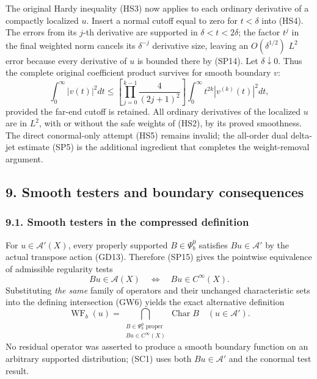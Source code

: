 \documentclass[
  11pt,
]{article}
\makeatletter
\let\ReaderOriginalAnchorStart\hyper@anchorstart
\let\ReaderOriginalAnchorEnd\hyper@anchorend
\let\ReaderPendingAliases\@empty
\def\ReaderArmAliases#1{\gdef\ReaderPendingAliases{#1}}
\def\hyper@anchorstart#1{\ReaderIfNativeAnchorTF{#1}{\ReaderPendingAliases\global\let\ReaderPendingAliases\@empty}{}\ReaderOriginalAnchorStart{#1}}
\makeatother
\begin{document}
The original Hardy inequality (HS3) now applies to each ordinary
derivative of a compactly localized \(u\). Insert a normal cutoff equal
to zero for \(t<\delta\) into (HS4). The errors from its \(j\)-th
derivative are supported in \(\delta<t<2\delta\); the factor \(t^j\) in
the final weighted norm cancels its \(\delta^{-j}\) derivative size,
leaving an \(O(\delta^{1/2})\) \(L^2\) error because every derivative of
\(u\) is bounded there by (SP14). Let \(\delta\downarrow0\). Thus the
complete original coefficient product survives for smooth boundary
\(v\): \[
 \int_0^\infty|v(t)|^2dt
 \le\left[\prod_{j=0}^{k-1}
         \frac4{(2j+1)^2}\right]
       \int_0^\infty t^{2k}|v^{(k)}(t)|^2dt,
 \tag{SP16}
\] provided the far-end cutoff is retained. All ordinary derivatives of
the localized \(u\) are in \(L^2\), with or without the safe weights of
(HS2), by its proved smoothness. The direct conormal-only attempt (HS5)
remains invalid; the all-order dual delta-jet estimate (SP5) is the
additional ingredient that completes the weight-removal argument.

\ReaderArmAliases{\ReaderOriginalAnchorStart{AN03-GBD-009}\ReaderOriginalAnchorEnd\begingroup\expandafter\def\csname @currentHref\endcsname{AN03-GBD-009}\label{AN03-GBD-009}\endgroup\ReaderOriginalAnchorStart{9-smooth-testers-and-boundary-consequences}\ReaderOriginalAnchorEnd\begingroup\expandafter\def\csname @currentHref\endcsname{9-smooth-testers-and-boundary-consequences}\label{9-smooth-testers-and-boundary-consequences}\endgroup}
\subsection{9. Smooth testers and boundary
consequences}\label{smooth-testers-and-boundary-consequences}

\subsubsection{9.1. Smooth testers in the compressed
definition}\label{smooth-testers-in-the-compressed-definition}

For \(u\in\mathcal A'(X)\), every properly supported \(B\in\Psi_b^0\)
satisfies \(Bu\in\mathcal A'\) by the actual transpose action (GD13).
Therefore (SP15) gives the pointwise equivalence of admissible
regularity tests \[
 Bu\in\mathcal A(X)
       \quad\Longleftrightarrow\quad
 Bu\in C^\infty(X).
 \tag{SC1}
\] Substituting \emph{the same} family of operators and their unchanged
characteristic sets into the defining intersection (GW6) yields the
exact alternative definition \[
 \operatorname{WF}_b(u)
   =\bigcap_{\substack{B\in\Psi_b^0\text{ proper}\\
                       Bu\in C^\infty(X)}}
                     \operatorname{Char}B
 \quad(u\in\mathcal A').
 \tag{SC2}
\] No residual operator was asserted to produce a smooth boundary
function on an arbitrary supported distribution; (SC1) uses both
\(Bu\in\mathcal A'\) and the conormal test result.
\end{document}
